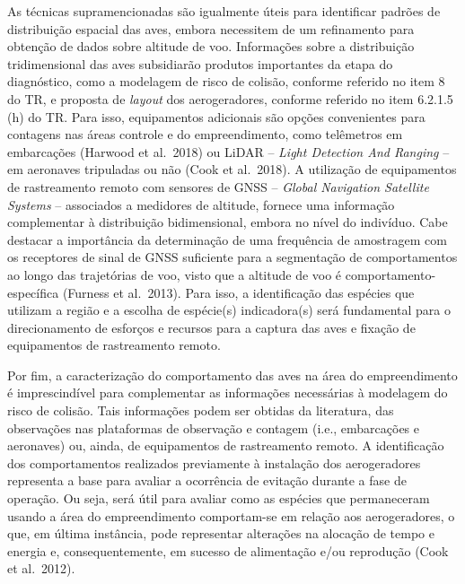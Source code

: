 \documentclass[
  oneside]{scrbook}
\begin{document}
As técnicas supramencionadas são igualmente úteis para identificar padrões de distribuição espacial das aves, embora necessitem de um refinamento para obtenção de dados sobre altitude de voo. Informações sobre a distribuição tridimensional das aves subsidiarão produtos importantes da etapa do diagnóstico, como a modelagem de risco de colisão, conforme referido no item 8 do TR, e proposta de \emph{layout} dos aerogeradores, conforme referido no item 6.2.1.5 (h) do TR. Para isso, equipamentos adicionais são opções convenientes para contagens nas áreas controle e do empreendimento, como telêmetros em embarcações (Harwood et al.~2018) ou LiDAR -- \emph{Light Detection And Ranging} -- em aeronaves tripuladas ou não (Cook et al.~2018). A utilização de equipamentos de rastreamento remoto com sensores de GNSS -- \emph{Global Navigation Satellite Systems} -- associados a medidores de altitude, fornece uma informação complementar à distribuição bidimensional, embora no nível do indivíduo. Cabe destacar a importância da determinação de uma frequência de amostragem com os receptores de sinal de GNSS suficiente para a segmentação de comportamentos ao longo das trajetórias de voo, visto que a altitude de voo é comportamento-específica (Furness et al.~2013). Para isso, a identificação das espécies que utilizam a região e a escolha de espécie(s) indicadora(s) será fundamental para o direcionamento de esforços e recursos para a captura das aves e fixação de equipamentos de rastreamento remoto.

Por fim, a caracterização do comportamento das aves na área do empreendimento é imprescindível para complementar as informações necessárias à modelagem do risco de colisão. Tais informações podem ser obtidas da literatura, das observações nas plataformas de observação e contagem (i.e., embarcações e aeronaves) ou, ainda, de equipamentos de rastreamento remoto. A identificação dos comportamentos realizados previamente à instalação dos aerogeradores representa a base para avaliar a ocorrência de evitação durante a fase de operação. Ou seja, será útil para avaliar como as espécies que permaneceram usando a área do empreendimento comportam-se em relação aos aerogeradores, o que, em última instância, pode representar alterações na alocação de tempo e energia e, consequentemente, em sucesso de alimentação e/ou reprodução (Cook et al.~2012).
\end{document}
